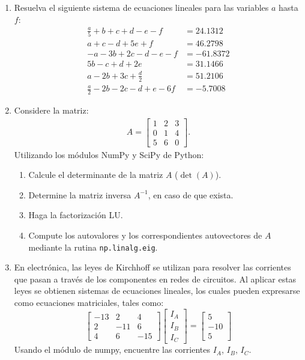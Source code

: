 \documentclass[12pt]{article}
\begin{document}
\begin{problemas}[]
\begin{enumerate}[leftmargin=*]
\item Resuelva el siguiente sistema de ecuaciones lineales para las 
variables $a$ hasta $f$:
\begin{align*}
\frac{a}{5} + b + c + d - e - f &= 24.1312 \\
a + c - d + 5e + f &= 46.2798 \\
-a - 3b + 2c - d - e - f &= -61.8372 \\
5b - c + d + 2e &= 31.1466 \\
a - 2b + 3c + \frac{d}{2} &= 51.2106 \\
\frac{a}{2} - 2b - 2c - d + e - 6f &= -5.7008
\end{align*}

\item Considere la matriz:
%
\begin{align*}
   A = 
   \begin{bmatrix}
      1 & 2 & 3 \\
      0 & 1 & 4 \\
      5 & 6 & 0
   \end{bmatrix}.
\end{align*}
%
Utilizando los módulos NumPy y SciPy de Python:

\begin{enumerate}[label=\alph*)]
   \item Calcule el determinante de la matriz $A$ ($\det(A)$).
   \item Determine la matriz inversa $A^{-1}$, en caso de que exista.
   \item Haga la factorización LU.
   \item Compute los autovalores y los correspondientes autovectores de $A$ mediante la rutina \lstinline|np.linalg.eig|.
\end{enumerate}

\item En electrónica, las leyes de Kirchhoff se 
utilizan para resolver las corrientes que pasan a través de los 
componentes en redes de circuitos. 
Al aplicar estas leyes se obtienen sistemas de ecuaciones lineales, 
los cuales pueden expresarse como ecuaciones matriciales, 
tales como:
%
\begin{equation}
\begin{bmatrix}
-13 & 2 & 4 \\
2 & -11 & 6 \\
4 & 6 & -15
\end{bmatrix}
\begin{bmatrix}
I_A \\
I_B \\
I_C
\end{bmatrix}
=
\begin{bmatrix}
5 \\
-10 \\
5 
\end{bmatrix}\nonumber
\end{equation}
Usando el módulo de numpy, encuentre las corrientes $I_A$, $I_B$, $I_C$.



\end{enumerate}
\end{problemas}
\end{document}
